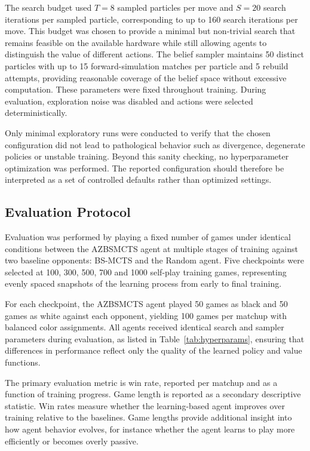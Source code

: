 \documentclass[12pt,oneside,openright]{article}
\begin{document}
The search budget used $T = 8$ sampled particles per move and $S = 20$ search iterations per sampled particle, corresponding to up to 160 search iterations per move. This budget was chosen to provide a minimal but non-trivial search that remains feasible on the available hardware while still allowing agents to distinguish the value of different actions. The belief sampler maintains 50 distinct particles with up to 15 forward-simulation matches per particle and 5 rebuild attempts, providing reasonable coverage of the belief space without excessive computation.
These parameters were fixed throughout training.
During evaluation, exploration noise was disabled and actions were selected deterministically.

Only minimal exploratory runs were conducted to verify that the chosen configuration did not lead to pathological behavior such as divergence, degenerate policies or unstable training. Beyond this sanity checking, no hyperparameter optimization was performed. The reported configuration should therefore be interpreted as a set of controlled defaults rather than optimized settings.

\subsection{Evaluation Protocol}

Evaluation was performed by playing a fixed number of games under identical conditions between the AZBSMCTS agent at multiple stages of training against two baseline opponents: BS-MCTS and the Random agent. Five checkpoints were selected at 100, 300, 500, 700 and 1000 self-play training games, representing evenly spaced snapshots of the learning process from early to final training.

For each checkpoint, the AZBSMCTS agent played 50 games as black and 50 games as white against each opponent, yielding 100 games per matchup with balanced color assignments. All agents received identical search and sampler parameters during evaluation, as listed in Table~\ref{tab:hyperparams}, ensuring that differences in performance reflect only the quality of the learned policy and value functions.

The primary evaluation metric is win rate, reported per matchup and as a function of
training progress. Game length is reported as a secondary descriptive statistic. Win rates measure whether the learning-based agent improves over training relative to the baselines. Game lengths provide additional insight into how agent behavior evolves, for instance whether the agent learns to play more efficiently or becomes overly passive.
\end{document}
